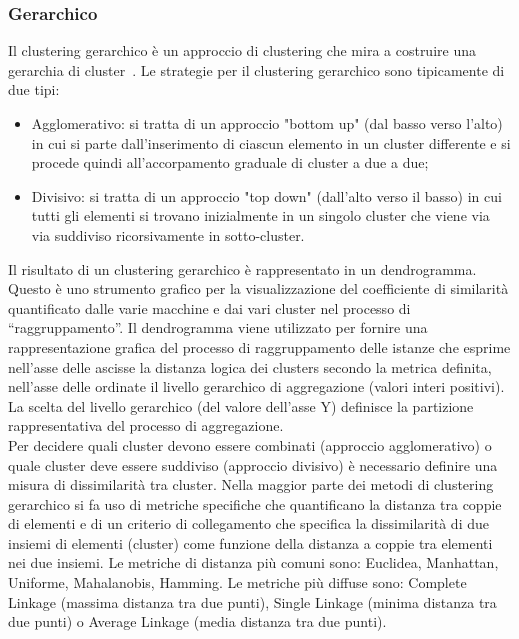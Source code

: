 \subsubsection{Gerarchico}
Il clustering gerarchico è un approccio di clustering che mira a costruire una gerarchia di cluster~\cite{10}. Le strategie per il clustering gerarchico sono tipicamente di due tipi:
\begin{itemize}
	\item Agglomerativo: si tratta di un approccio "bottom up" (dal basso verso l'alto) in cui si parte dall'inserimento di ciascun elemento in un cluster differente e si procede quindi all'accorpamento graduale di cluster a due a due;
	\item Divisivo: si tratta di un approccio "top down" (dall'alto verso il basso) in cui tutti gli elementi si trovano inizialmente in un singolo cluster che viene via via suddiviso ricorsivamente in sotto-cluster.
\end{itemize}
Il risultato di un clustering gerarchico è rappresentato in un dendrogramma. Questo è uno strumento grafico per la visualizzazione del coefficiente di similarità quantificato dalle varie macchine e dai vari cluster nel processo di “raggruppamento”. Il dendrogramma viene utilizzato per fornire una rappresentazione grafica del processo di raggruppamento delle istanze che esprime nell'asse delle ascisse la distanza logica dei clusters secondo la metrica definita, nell'asse delle ordinate il livello gerarchico di aggregazione (valori interi positivi). 
La scelta del livello gerarchico (del valore dell'asse Y) definisce la partizione rappresentativa del processo di aggregazione.\\
Per decidere quali cluster devono essere combinati (approccio agglomerativo) o quale cluster deve essere suddiviso (approccio divisivo) è necessario definire una misura di dissimilarità tra cluster. Nella maggior parte dei metodi di clustering gerarchico si fa uso di metriche specifiche che quantificano la distanza tra coppie di elementi e di un criterio di collegamento che specifica la dissimilarità di due insiemi di elementi (cluster) come funzione della distanza a coppie tra elementi nei due insiemi. Le metriche di distanza più comuni sono: Euclidea, Manhattan, Uniforme, Mahalanobis, Hamming. Le metriche più diffuse sono: Complete Linkage (massima distanza tra due punti), Single Linkage (minima distanza tra due punti) o Average Linkage (media distanza tra due punti).
